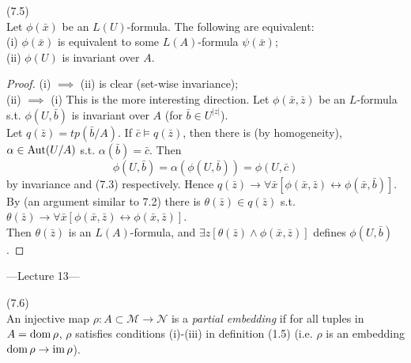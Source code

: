 \documentclass[a4paper]{article}
\begin{document}
\begin{prop} (7.5)\\
    Let $\phi(\bar{x})$ be an $L(U)$-formula. The following are equivalent:\\
    (i) $\phi(\bar{x})$ is equivalent to some $L(A)$-formula $\psi(\bar{x})$;\\
    (ii) $\phi(U)$ is invariant over $A$.
    \begin{proof}
        (i) $\implies$ (ii) is clear (set-wise invariance);\\
        (ii) $\implies$ (i) This is the more interesting direction. Let $\phi(\bar{x},\bar{z})$ be an $L$-formula s.t. $\phi(U,\bar{b})$ is invariant over $A$ (for $\bar{b} \in U^{|z|}$).\\
        Let $q(\bar{z}) = tp(\bar{b}/A)$. If $\bar{c} \vDash q(\bar{z})$, then there is (by homogeneity), $\alpha \in \operatorname{Aut} (U/A)$ s.t. $\alpha(\bar{b}) = \bar{c}$. Then 
        $$\phi(U,\bar{b}) = \alpha(\phi(U,\bar{b})) = \phi(U,\bar{c})$$
        by invariance and (7.3) respectively. Hence $q(\bar{z}) \to \forall \bar{x} [\phi(\bar{x},\bar{z}) \leftrightarrow \phi(\bar{x},\bar{b})]$. By (an argument similar to 7.2) there is $\theta(\bar{z}) \in q(\bar{z})$ s.t. $\theta(\bar{z}) \to \forall \bar{x}[\phi(\bar{x},\bar{z}) \leftrightarrow \phi(\bar{x},\bar{z})]$.\\
        Then $\theta(\bar{z})$ is an $L(A)$-formula, and $\exists z [\theta(\bar{z}) \wedge \phi(\bar{x},\bar{z})]$ defines $\phi(U,\bar{b})$.
    \end{proof}
\end{prop}

---Lecture 13---

\begin{defi} (7.6)\\
    An injective map $\rho:A \subset \mathcal{M} \to \mathcal{N}$ is a \emph{partial embedding} if for all tuples in $A=\operatorname{dom}\rho$, $\rho$ satisfies conditions (i)-(iii) in definition (1.5) (i.e. $\rho$ is an embedding $\operatorname{dom} \rho \to \operatorname{im} \rho$).
\end{defi}
\end{document}
